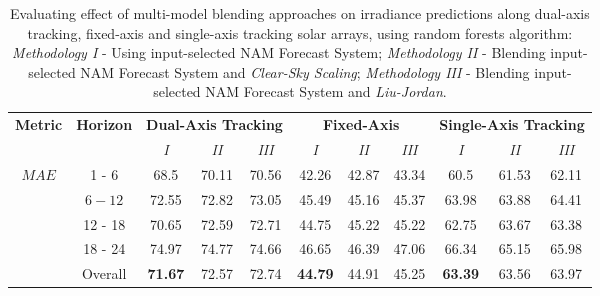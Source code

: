\begin{table}[h]
\begin{center}
    \caption[Evaluating effect of multi-model blending approaches on irradiance predictions using weather data along dual-axis tracking, fixed-axis and single-axis tracking solar arrays, using random forests algorithm.]{Evaluating effect of multi-model blending approaches on irradiance predictions along dual-axis tracking, fixed-axis and single-axis tracking solar arrays, using random forests algorithm: \textit{Methodology I} - Using input-selected NAM Forecast System; \textit{Methodology II} - Blending input-selected NAM Forecast System and \textit{Clear-Sky Scaling}; \textit{Methodology III} - Blending input-selected NAM Forecast System and \textit{Liu-Jordan}.}
    \label{Tab:mmb_array_abe2}
    \begin{tabular}{@{}ccccccccccc@{}}
    \toprule
    \multirow{2}{*}{\textbf{Metric}} & \multirow{2}{*}{\textbf{Horizon}} & \multicolumn{3}{c}{\textbf{Dual-Axis Tracking}} & \multicolumn{3}{c}{\textbf{Fixed-Axis}} & \multicolumn{3}{c}{\textbf{Single-Axis Tracking}}\\
    \cmidrule{3-11}
     &  & \textit{I} & \textit{II} & \textit{III} & \textit{I} & \textit{II} & \textit{III} & \textit{I} & \textit{II} & \textit{III} \\
    \midrule
     \multirow{5}{*}{$MAE$}  & 1 - 6 & 68.5  & 70.11 & 70.56 & 42.26 & 42.87 & 43.34 & 60.5  & 61.53 & 62.11 \\
           & $6 - 12$   & 72.55 & 72.82 & 73.05 & 45.49 & 45.16 & 45.37 & 63.98 & 63.88 & 64.41 \\
           & 12 - 18    & 70.65 & 72.59 & 72.71 & 44.75 & 45.22 & 45.22 & 62.75 & 63.67 & 63.38 \\
           & 18 - 24    & 74.97 & 74.77 & 74.66 & 46.65 & 46.39 & 47.06 & 66.34 & 65.15 & 65.98 \\
           & Overall    & \textbf{71.67} & 72.57 & 72.74 & \textbf{44.79} & 44.91 & 45.25 & \textbf{63.39} & 63.56 & 63.97 \\                     


\end{tabular}
\end{center}
\end{table}
